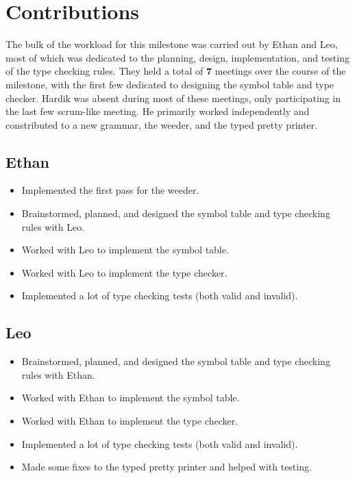\documentclass{article}
\begin{document}
\section{Contributions}

The bulk of the workload for this milestone was carried out by Ethan and Leo, most of which was dedicated to the planning, design, implementation, and testing of the type checking rules.
They held a total of \textbf{7} meetings over the course of the milestone, with the first few dedicated to designing the symbol table and type checker.
Hardik was absent during most of these meetings, only participating in the last few scrum-like meeting.
He primarily worked independently and constributed to a new grammar, the weeder, and the typed pretty printer.

\subsection*{Ethan}

\begin{itemize}
    \item Implemented the first pass for the weeder.
    \item Brainstormed, planned, and designed the symbol table and type checking rules with Leo.
    \item Worked with Leo to implement the symbol table.
    \item Worked with Leo to implement the type checker.
    \item Implemented a lot of type checking tests (both valid and invalid).
\end{itemize}

\subsection*{Leo}

\begin{itemize}
    \item Brainstormed, planned, and designed the symbol table and type checking rules with Ethan.
    \item Worked with Ethan to implement the symbol table.
    \item Worked with Ethan to implement the type checker.
    \item Implemented a lot of type checking tests (both valid and invalid).
    \item Made some fixes to the typed pretty printer and helped with testing.
\end{itemize}
\end{document}
